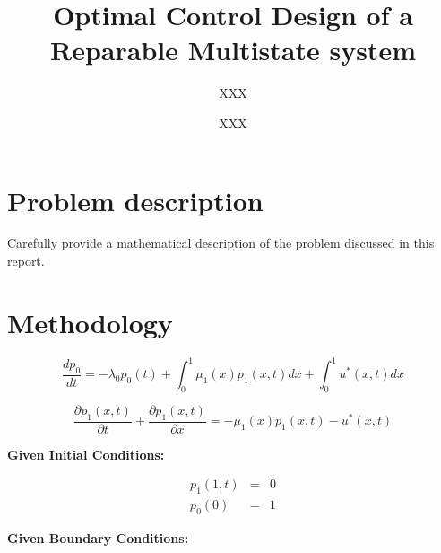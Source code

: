 \documentclass{ifacconf}
\begin{document}
\begin{frontmatter}


\title{
	Optimal Control Design of a Reparable Multistate system}%


\author[First]{XXX} 
\author[Second]{XXX} 


\address[First]{University of Southern California, 
   LA, CA 90089 USA (e-mail: XXX@ usc.edu).}

\address[Second]{University of Southern California, 
   LA, CA 90089 USA (e-mail: XXX@ usc.edu).}

\begin{abstract}                %

\end{abstract}

\begin{keyword}

\end{keyword}

\end{frontmatter}

\section{Problem description}
Carefully provide a mathematical description of the problem discussed in this report. 

\section{Methodology}
\label{sec:method}
\begin{equation}
\label{eq1}
\frac{dp_0}{dt} = -\lambda_0 p_0(t) + \int_0^1 \mu_1(x)p_1(x,t)dx + \int_0^1u^{*}(x,t)dx
\end{equation}

\begin{equation}
\label{eq2}
\frac{\partial p_1(x,t)}{\partial t} + \frac{\partial p_1(x,t)}{\partial x} = -\mu_1(x)p_1(x,t) - u^{*}(x,t)
\end{equation}


\textbf{Given Initial Conditions:}

\begin{eqnarray}
p_1(1,t) &=& 0\\
p_0(0) &=& 1
\end{eqnarray}

\textbf{Given Boundary Conditions:}
\end{document}
